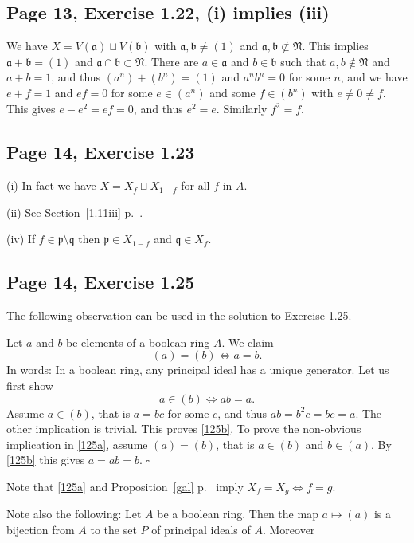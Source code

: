 \documentclass[parskip=half,fontsize=12pt]{scrartcl}%
\newcommand{\mf}{\mathfrak}
\newcommand{\aaa}{\mf a}
\newcommand{\bbb}{\mf b}
\newcommand{\ppp}{\mf p}
\newcommand{\qqq}{\mf q}
\begin{document}
\subsection{Page 13, Exercise 1.22, (i) implies (iii)}%

We have $X=V(\aaa)\sqcup V(\bbb)$ with $\aaa,\bbb\ne(1)$ and $\aaa,\bbb\not\subset\mf N$. This implies $\aaa+\bbb=(1)$ and $\aaa\cap\bbb\subset\mf N$. There are $a\in\aaa$ and $b\in\bbb$ such that $a,b\notin\mf N$ and $a+b=1$, and thus $(a^n)+(b^n)=(1)$ and $a^nb^n=0$ for some $n$, and we have $e+f=1$ and $ef=0$ for some $e\in(a^n)$ and some $f\in(b^n)$ with $e\ne0\ne f$. This gives $e-e^2=ef=0$, and thus $e^2=e$. Similarly $f^2=f$.

\subsection{Page 14, Exercise 1.23}%

(i) In fact we have $X=X_f\sqcup X_{1-f}$ for all $f$ in $A$.

(ii) See Section~\ref{1.11iii} p.~\pageref{1.11iii}.

(iv) If $f\in\ppp\setminus\qqq$ then $\ppp\in X_{1-f}$ and $\qqq\in X_f$.

\subsection{Page 14, Exercise 1.25}%

The following observation can be used in the solution to Exercise 1.25.

Let $a$ and $b$ be elements of a boolean ring $A$. We claim
\begin{equation}\label{125a}
(a)=(b)\iff a=b.
\end{equation} 
In words: In a boolean ring, any principal ideal has a unique generator. Let us first show 
\begin{equation}\label{125b}
a\in(b)\iff ab=a.
\end{equation}
Assume $a\in(b)$, that is $a=bc$ for some $c$, and thus $ab=b^2c=bc=a$. The other implication is trivial. This proves \eqref{125b}. To prove the non-obvious implication in \eqref{125a}, assume $(a)=(b)$, that is $a\in(b)$ and $b\in(a)$. By \eqref{125b} this gives $a=ab=b$. $\square$

Note that \eqref{125a} and Proposition~\ref{gal} p.~\pageref{gal} imply $X_f=X_g\iff f=g$.

Note also the following: Let $A$ be a boolean ring. Then the map $a\mapsto(a)$ is a bijection from $A$ to the set $P$ of principal ideals of $A$. Moreover 
\end{document}
